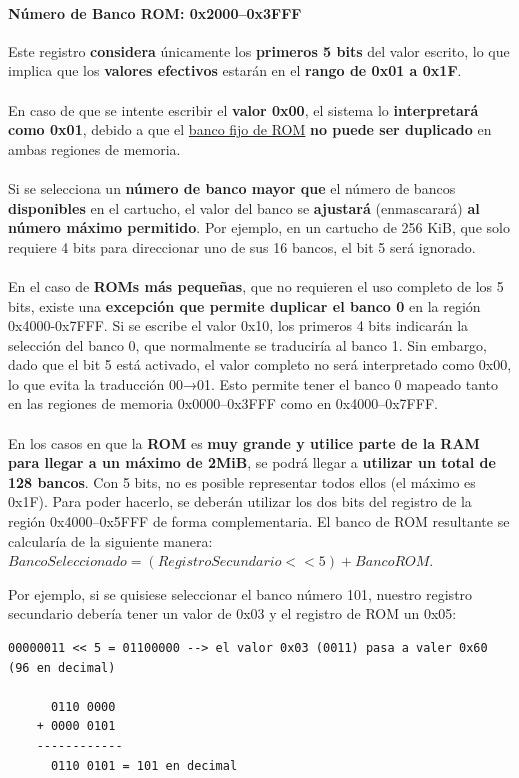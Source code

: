 \paragraph{Número de Banco ROM: 0x2000–0x3FFF} Este registro \textbf{considera} únicamente los \textbf{primeros 5 bits} del valor escrito, lo que implica que los \textbf{valores efectivos} estarán en el \textbf{rango de 0x01 a 0x1F}.
\\\\
En caso de que se intente escribir el \textbf{valor 0x00}, el sistema lo \textbf{interpretará como 0x01}, debido a que el \hyperref[par:rom0bank]{banco fijo de ROM} \textbf{no puede ser duplicado} en ambas regiones de memoria.
\\\\
Si se selecciona un \textbf{número de banco mayor que} el número de bancos \textbf{disponibles} en el cartucho, el valor del banco se \textbf{ajustará} (enmascarará) \textbf{al número máximo permitido}. Por ejemplo, en un cartucho de 256 KiB, que solo requiere 4 bits para direccionar uno de sus 16 bancos, el bit 5 será ignorado.
\\\\
En el caso de \textbf{ROMs más pequeñas}, que no requieren el uso completo de los 5 bits, existe una \textbf{excepción que permite duplicar el banco 0} en la región 0x4000-0x7FFF. Si se escribe el valor 0x10, los primeros 4 bits indicarán la selección del banco 0, que normalmente se traduciría al banco 1. Sin embargo, dado que el bit 5 está activado, el valor completo no será interpretado como 0x00, lo que evita la traducción 00→01. Esto permite tener el banco 0 mapeado tanto en las regiones de memoria 0x0000–0x3FFF como en 0x4000–0x7FFF.
\\\\
En los casos en que la \textbf{ROM} es \textbf{muy grande y utilice parte de la RAM para llegar a un máximo de 2MiB}, se podrá llegar a \textbf{utilizar un total de 128 bancos}. Con 5 bits, no es posible representar todos ellos (el máximo es 0x1F). Para poder hacerlo, se deberán utilizar los dos bits del registro de la región 0x4000–0x5FFF de forma complementaria. El banco de ROM resultante se calcularía de la siguiente manera: $BancoSeleccionado = (RegistroSecundario << 5) + BancoROM$.

Por ejemplo, si se quisiese seleccionar el banco número 101, nuestro registro secundario debería tener un valor de 0x03 y el registro de ROM un 0x05:

\begin{lstlisting}[language=Consola, caption={Selección del banco de ROM en cartuchos grandes.}, label={code:bigromselectbank}]
    00000011 << 5 = 01100000 --> el valor 0x03 (0011) pasa a valer 0x60 (96 en decimal)

      0110 0000
    + 0000 0101
    ------------
      0110 0101 = 101 en decimal
\end{lstlisting}

